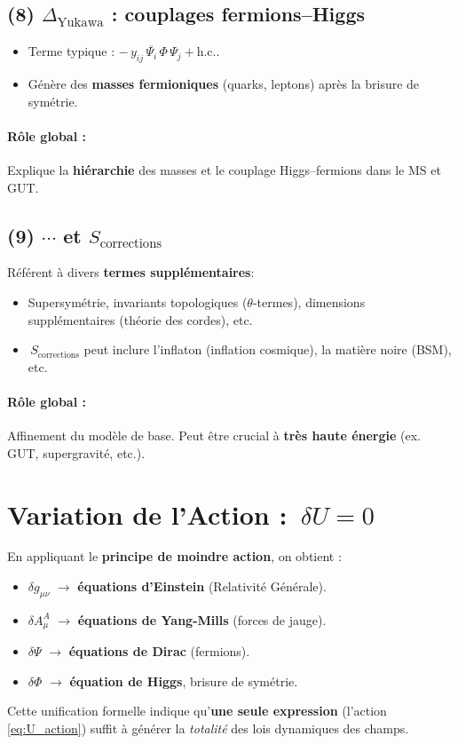 \documentclass[12pt]{article}
\begin{document}
\subsection{(8) \(\displaystyle \Delta_{\text{Yukawa}}\) : couplages fermions--Higgs}

\begin{itemize}
\item Terme typique : \(-\,y_{ij}\,\overline{\Psi_i}\,\Phi\,\Psi_j + \text{h.c.}\).
\item G\'en\`ere des \textbf{masses fermioniques} (quarks, leptons) apr\`es la brisure de sym\'etrie.
\end{itemize}
\paragraph{R\^ole global :}
Explique la \textbf{hi\'erarchie} des masses et le couplage Higgs--fermions dans le MS et GUT.

\subsection{(9) \(\displaystyle \cdots\) et \(\displaystyle S_{\text{corrections}}\)}

R\'ef\'erent \`a divers \textbf{termes suppl\'ementaires}:
\begin{itemize}
\item Supersym\'etrie, invariants topologiques (\(\theta\)-termes), 
      dimensions suppl\'ementaires (th\'eorie des cordes), etc.
\item \(\,S_{\text{corrections}}\) peut inclure l'inflaton (inflation cosmique), 
      la mati\`ere noire (BSM), etc.
\end{itemize}
\paragraph{R\^ole global :}
Affinement du mod\`ele de base. 
Peut \^etre crucial \`a \textbf{tr\`es haute \'energie} (ex. GUT, supergravité, etc.).

\section{Variation de l'Action : \(\,\delta U = 0\)}

En appliquant le \textbf{principe de moindre action}, on obtient :
\begin{itemize}
\item \(\delta g_{\mu\nu}\) $\to$ \textbf{\'equations d'Einstein} (Relativit\'e G\'en\'erale).
\item \(\delta A_\mu^A\) $\to$ \textbf{\'equations de Yang-Mills} (forces de jauge).
\item \(\delta \Psi\) $\to$ \textbf{\'equations de Dirac} (fermions).
\item \(\delta \Phi\) $\to$ \textbf{\'equation de Higgs}, brisure de sym\'etrie.
\end{itemize}
Cette unification formelle indique qu'\textbf{une seule expression} (l'action \eqref{eq:U_action}) 
suffit \`a g\'en\'erer la \emph{totalit\'e} des lois dynamiques des champs.
\end{document}
